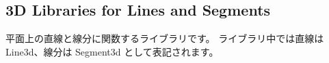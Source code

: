 \subsection{3D Libraries for Lines and Segments}

平面上の直線と線分に関数するライブラリです。
ライブラリ中では直線は Line3d、線分は Segment3d として表記されます。


